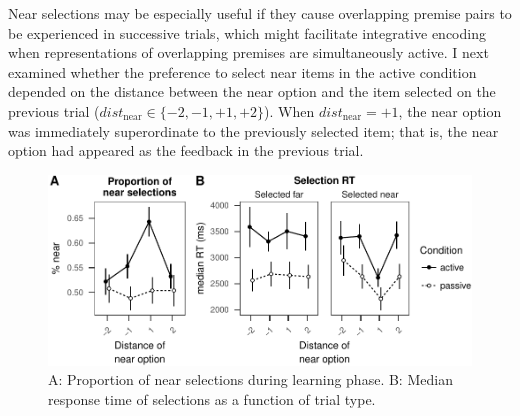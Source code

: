 \documentclass[floatsintext,man]{apa6}
\theoremstyle{definition}
\theoremstyle{definition}
\theoremstyle{definition}
\theoremstyle{remark}
\begin{document}
Near selections may be especially useful if they cause overlapping
premise pairs to be experienced in successive trials, which might
facilitate integrative encoding when representations of overlapping
premises are simultaneously active. I next examined whether the
preference to select near items in the active condition depended on the
distance between the near option and the item selected on the previous
trial (\(dist_{\text{near}} \in \{-2, -1, +1, +2\}\)). When
\(dist_{\text{near}}=+1\), the near option was immediately superordinate
to the previously selected item; that is, the near option had appeared
as the feedback in the previous trial.

\begin{figure}
\centering
\includegraphics{active_transitive_inference_files/figure-latex/unnamed-chunk-5-1.pdf}
\caption{\label{fig:unnamed-chunk-5}A: Proportion of near selections during
learning phase. B: Median response time of selections as a function of
trial type. \label{fig_prop_near}}
\end{figure}
\end{document}
